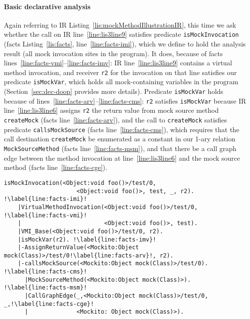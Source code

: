 \paragraph{Basic declarative analysis} Again referring to IR Listing~\ref{lis:mockMethodIllustrationIR}, this time we ask whether the call on IR line~\ref{line:lis3line9} satisfies predicate \texttt{isMockInvocation} (facts Listing~\ref{lis:facts}, line~\ref{line:facts-imi}), which we define to hold the analysis result (all mock invocation sites in the program). It does, because of facts lines~\ref{line:facts-vmi}--\ref{line:facts-imv}: IR line~\ref{line:lis3line9} contains a virtual method invocation, and receiver \texttt{r2} for the invocation on that line satisfies our predicate \texttt{isMockVar}, which holds all mock-containing variables in the program (Section~\ref{sec:dec-doop} provides more details). Predicate \texttt{isMockVar} holds because of lines~\ref{line:facts-arv}--\ref{line:facts-cms}: \texttt{r2} satisfies \texttt{isMockVar} because IR line~\ref{line:lis3line6} assigns \texttt{r2} the return value from mock source method \texttt{createMock} (facts line~\ref{line:facts-arv}), and the call to \texttt{createMock} satisfies predicate \texttt{callsMockSource} (facts line~\ref{line:facts-cms}), which requires that the call destination \texttt{createMock} be enumerated as a constant in our 1-ary relation \texttt{MockSourceMethod} (facts line~\ref{line:facts-msm}), and that there be a call graph edge between the method invocation at line~\ref{line:lis3line6} and the mock source method (facts line~\ref{line:facts-cge}).


\begin{lstlisting}[basicstyle=\ttfamily, caption={Facts about invocation \texttt{r2.foo()} in method \texttt{test}.},
basicstyle=\scriptsize\ttfamily, framesep=4.5mm, framexleftmargin=1.0mm, captionpos=b, label=lis:facts, escapechar=!, morekeywords={@Test}]
	isMockInvocation(<Object:void foo()>/test/0, 
	                 <Object:void foo()>, test, _, r2). !\label{line:facts-imi}!
	|VirtualMethodInvocation(<Object:void foo()>/test/0, !\label{line:facts-vmi}!
	|                        <Object:void foo()>, test).
	|VMI_Base(<Object:void foo()>/test/0, r2).
	|isMockVar(r2). !\label{line:facts-imv}!
	|-AssignReturnValue(<Mockito:Object mock(Class)>/test/0!\label{line:facts-arv}!, r2).
	|-callsMockSource(<Mockito:Object mock(Class)>/test/0). !\label{line:facts-cms}!
	  |MockSourceMethod(<Mockito:Object mock(Class)>). !\label{line:facts-msm}!
	  |CallGraphEdge(_,<Mockito:Object mock(Class)>/test/0, _,!\label{line:facts-cge}!
	  |              <Mockito: Object mock(Class)>). 
\end{lstlisting}


